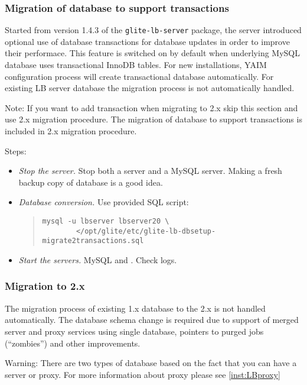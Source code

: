 \subsubsection{Migration of database to support transactions}
Started from version 1.4.3 of the \texttt{glite-lb-server}
package, the \LB server introduced optional use of database
transactions for \LB database updates in order to improve their
performace. This feature is switched on by default when underlying
MySQL database uses transactional InnoDB tables. For new
installations, YAIM configuration process will create transactional
database automatically. For existing LB server database the migration 
process is not automatically handled.

Note: If you want to add transaction when migrating to \LB 2.x skip
this section and use \LB 2.x migration procedure. The migration of
database to support transactions is included in \LB 2.x migration procedure.

Steps:
\begin{itemize}
 \item \emph{Stop the server.} Stop both a \LB server and a MySQL
 server. Making a fresh backup copy of database is a good idea.
 \item \emph{Database conversion.} Use provided SQL script:
  \begin{quote}
   \begin{verbatim}
mysql -u lbserver lbserver20 \
        </opt/glite/etc/glite-lb-dbsetup-migrate2transactions.sql
   \end{verbatim}
  \end{quote}
 \item \emph{Start the servers.} MySQL and \LB. Check logs.
\end{itemize}


\subsubsection{Migration to \LB 2.x}
\label{inst:migrate20}
The migration process of existing \LB 1.x database to the \LB 2.x is
not handled automatically. The database schema change is required due
to support of merged \LB server and proxy services using single
database, pointers to purged jobs (``zombies'') and other
improvements.

Warning: There are two types of \LB database based on the fact that
you can have a \LB server or \LB proxy. For more information about \LB
proxy please see \ref{inst:LBproxy}

